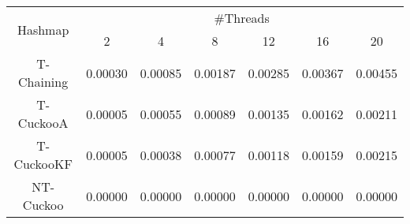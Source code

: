 \begin{tabular}{|c|c|c|c|c|c|c|}
\hline
\multirow{2}{*}{Hashmap} & \multicolumn{6}{c|}{\#Threads}\\\cline{2-7}& 2 & 4 & 8 & 12 & 16 & 20\\
\hline
\hline
T-Chaining & 0.00030 & 0.00085 & 0.00187 & 0.00285 & 0.00367 & 0.00455\\
T-CuckooA & 0.00005 & 0.00055 & 0.00089 & 0.00135 & 0.00162 & 0.00211\\
T-CuckooKF & 0.00005 & 0.00038 & 0.00077 & 0.00118 & 0.00159 & 0.00215\\
NT-Cuckoo & 0.00000 & 0.00000 & 0.00000 & 0.00000 & 0.00000 & 0.00000\\
\hline
\end{tabular}
